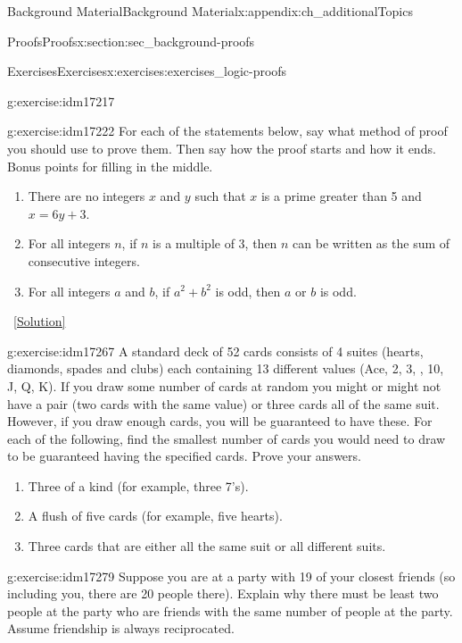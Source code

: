 \documentclass[oneside,10pt,]{book}
\numberwithin{equation}{chapter}
\begin{document}
\begin{appendixptx}{Background Material}{}{Background Material}{}{}{x:appendix:ch_additionalTopics}
\begin{sectionptx}{Proofs}{}{Proofs}{}{}{x:section:sec_background-proofs}
\begin{exercises-subsection}{Exercises}{}{Exercises}{}{}{x:exercises:exercises_logic-proofs}
\begin{divisionexercise}{14}{}{}{g:exercise:idm17217}
\end{divisionexercise}%
\begin{divisionexercise}{15}{}{}{g:exercise:idm17222}%
For each of the statements below, say what method of proof you should use to prove them. Then say how the proof starts and how it ends. Bonus points for filling in the middle.%
\par
%
\begin{enumerate}[label=(\alph*)]
\item{}There are no integers \(x\) and \(y\) such that \(x\) is a prime greater than 5 and \(x = 6y + 3\).%
\item{}For all integers \(n\), if \(n\) is a multiple of 3, then \(n\) can be written as the sum of consecutive integers.%
\item{}For all integers \(a\) and \(b\), if \(a^2 + b^2\) is odd, then \(a\) or \(b\) is odd.%
\end{enumerate}
%
\qquad~\hfill{\tiny\hyperlink{g:solution:idm17245-main}{[Solution]}}\end{divisionexercise}%
\begin{divisionexercise}{16}{}{}{g:exercise:idm17267}%
A standard deck of 52 cards consists of 4 suites (hearts, diamonds, spades and clubs) each containing 13 different values (Ace, 2, 3, \textellipsis{}, 10, J, Q, K). If you draw some number of cards at random you might or might not have a pair (two cards with the same value) or three cards all of the same suit. However, if you draw enough cards, you will be guaranteed to have these. For each of the following, find the smallest number of cards you would need to draw to be guaranteed having the specified cards. Prove your answers.%
\par
%
\begin{enumerate}[label=(\alph*)]
\item{}Three of a kind (for example, three 7's). %
\item{}A flush of five cards (for example, five hearts). %
\item{}Three cards that are either all the same suit or all different suits. %
\end{enumerate}
%
\end{divisionexercise}%
\begin{divisionexercise}{17}{}{}{g:exercise:idm17279}%
Suppose you are at a party with 19 of your closest friends (so including you, there are 20 people there). Explain why there must be least two people at the party who are friends with the same number of people at the party. Assume friendship is always reciprocated.%

\end{divisionexercise}
\end{exercises-subsection}
\end{sectionptx}
\end{appendixptx}
\end{document}
